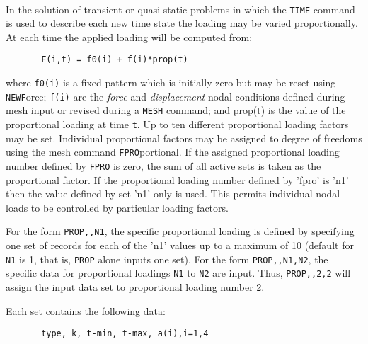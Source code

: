  \\{\smallskip}
\headb

In the solution of transient or quasi-static problems
in which the {\tt TIME} command is used to describe each new
time state the loading may be varied proportionally. At each
time the applied loading will be computed from:
\begin{verbatim}
       F(i,t) = f0(i) + f(i)*prop(t)
\end{verbatim}
where {\tt f0(i)} is a fixed pattern which is initially zero but
may be reset using {\tt NEWF}orce; {\tt f(i)} are
the {\it force} and {\it displacement}
nodal conditions defined during mesh input or
revised during a {\tt MESH} command; and prop(t) is the
value of the proportional loading at time {\tt t}.  Up to ten
different proportional loading factors may be set.  Individual
proportional factors may be assigned to degree of
freedoms using the mesh command {\tt FPRO}portional.  If the
assigned proportional loading number defined by {\tt FPRO} is
zero, the sum of all active sets is taken as the proportional
factor.  If the proportional loading number defined
by 'fpro' is 'n1' then the value defined by set 'n1' only is
used.  This permits individual nodal loads to be controlled
by particular loading factors.

For the form {\tt PROP,,N1}, the specific proportional
loading is defined by specifying one set of records for each
of the 'n1' values up to a maximum of 10 (default for {\tt N1}
is 1, that is, {\tt PROP} alone inputs one set).  For the form
{\tt PROP,,N1,N2}, the specific data for proportional loadings
{\tt N1} to {\tt N2} are input.  Thus, {\tt PROP,,2,2} will assign the
input data set to proportional loading number 2.

Each set contains the following data:
\begin{verbatim}
       type, k, t-min, t-max, a(i),i=1,4
\end{verbatim}

